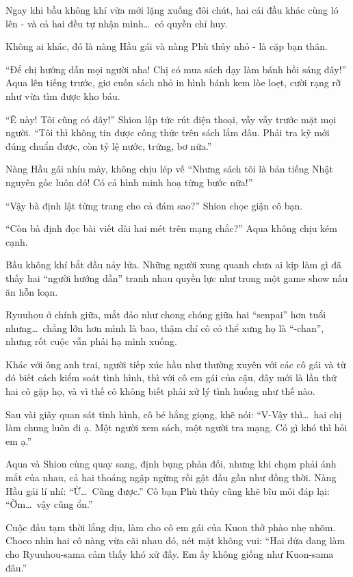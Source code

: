 \documentclass[../main.tex]{subfiles}
\begin{document}
Ngay khi bầu không khí vừa mới lặng xuống đôi chút, hai cái đầu khác cùng ló lên - và cả hai đều tự nhận mình\dots\ có quyền chỉ huy.

Không ai khác, đó là nàng Hầu gái và nàng Phù thủy nhỏ - là cặp bạn thân.

``Để chị hướng dẫn mọi người nha! Chị có mua sách dạy làm bánh hồi sáng đây!'' Aqua lên tiếng trước, giơ cuốn sách nhỏ in hình bánh kem lòe loẹt, cười rạng rỡ như vừa tìm được kho báu.

``Ê này! Tôi cũng có đây!'' Shion lập tức rút điện thoại, vẫy vẫy trước mặt mọi người. ``Tôi thì không tin được công thức trên sách lắm đâu. Phải tra kỹ mới đúng chuẩn được, còn tỷ lệ nước, trứng, bơ nữa.''

Nàng Hầu gái nhíu mày, không chịu lép vế ``Nhưng sách tôi là bản tiếng Nhật nguyên gốc luôn đó! Có cả hình minh hoạ từng bước nữa!''

``Vậy bà định lật từng trang cho cả đám sao?'' Shion chọc giận cô bạn.

``Còn bà định đọc bài viết dài hai mét trên mạng chắc?'' Aqua không chịu kém cạnh.

Bầu không khí bắt đầu nảy lửa. Những người xung quanh chưa ai kịp làm gì đã thấy hai ``người hướng dẫn'' tranh nhau quyền lực như trong một game show nấu ăn hỗn loạn.

Ryuuhou ở chính giữa, mắt đảo như chong chóng giữa hai ``senpai'' hơn tuổi nhưng\dots\ chẳng lớn hơn mình là bao, thậm chí cô có thể xưng họ là ``-chan'', nhưng rốt cuộc vẫn phải hạ mình xuống.

Khác với ông anh trai, người tiếp xúc hầu như thường xuyên với các cô gái và từ đó biết cách kiểm soát tình hình, thì với cô em gái của cậu, đây mới là lần thứ hai cô gặp họ, và vì thế cô không biết phải xử lý tình huống như thế nào.

Sau vài giây quan sát tình hình, cô bé hắng giọng, khẽ nói: ``V-Vậy thì\dots\ hai chị làm chung luôn đi ạ. Một người xem sách, một người tra mạng. Có gì khó thì hỏi em ạ.''

Aqua và Shion cùng quay sang, định bụng phản đối, nhưng khi chạm phải ánh mắt của nhau, cả hai thoáng ngập ngừng rồi gật đầu gần như đồng thời. Nàng Hầu gái lí nhí: ``Ừ\dots\ Cũng được.'' Cô bạn Phù thủy cũng khẽ bĩu môi đáp lại: ``Ờm\dots\ vậy cũng ổn.''

Cuộc đấu tạm thời lắng dịu, làm cho cô em gái của Kuon thở phào nhẹ nhõm. Choco nhìn hai cô nàng vừa cãi nhau đó, nét mặt không vui: ``Hai đứa đang làm cho Ryuuhou-sama cảm thấy khó xử đấy. Em ấy không giống như Kuon-sama đâu.''
\end{document}
